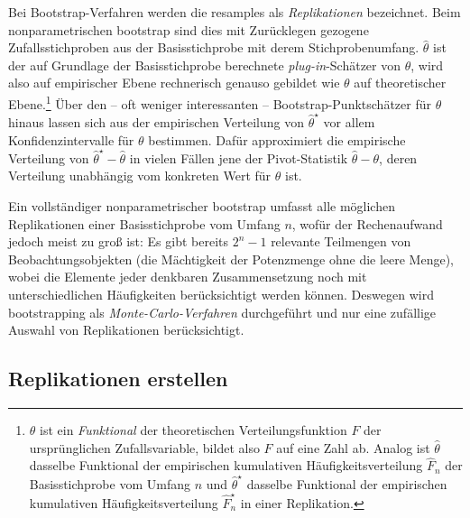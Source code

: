 Bei Bootstrap-Verfahren \cite{Chihara2011,Davison1997} werden die resamples als \emph{Replikationen} bezeichnet. Beim nonparametrischen bootstrap sind dies mit Zurücklegen gezogene Zufallsstichproben aus der Basisstichprobe mit derem Stichprobenumfang. $\hat{\theta}$ ist der auf Grundlage der Basisstichprobe berechnete \emph{plug-in}-Schätzer von $\theta$, wird also auf empirischer Ebene rechnerisch genauso gebildet wie $\theta$ auf theoretischer Ebene.\footnote{$\theta$ ist ein \emph{Funktional} der theoretischen Verteilungsfunktion $F$ der ursprünglichen Zufallsvariable, bildet also $F$ auf eine Zahl ab. Analog ist $\hat{\theta}$ dasselbe Funktional der empirischen kumulativen Häufigkeitsverteilung $\hat{F}_{n}$ der Basisstichprobe vom Umfang $n$ und $\hat{\theta}^{\star}$ dasselbe Funktional der empirischen kumulativen Häufigkeitsverteilung $\hat{F}_{n}^{\star}$ in einer Replikation.} Über den -- oft weniger interessanten -- Bootstrap-Punktschätzer für $\theta$ hinaus lassen sich aus der empirischen Verteilung von $\hat{\theta}^{\star}$ vor allem Konfidenzintervalle für $\theta$ bestimmen. Dafür approximiert die empirische Verteilung von $\hat{\theta}^{\star} - \hat{\theta}$ in vielen Fällen jene der Pivot-Statistik $\hat{\theta} - \theta$, deren Verteilung unabhängig vom konkreten Wert für $\theta$ ist.

Ein vollständiger nonparametrischer bootstrap umfasst alle möglichen Replikationen einer Basisstichprobe vom Umfang $n$, wofür der Rechenaufwand jedoch meist zu groß ist: Es gibt bereits $2^{n} - 1$ relevante Teilmengen von Beobachtungsobjekten (die Mächtigkeit der Potenzmenge ohne die leere Menge), wobei die Elemente jeder denkbaren Zusammensetzung noch mit unterschiedlichen Häufigkeiten berücksichtigt werden können. Deswegen wird bootstrapping als \emph{Monte-Carlo-Verfahren} durchgeführt und nur eine zufällige Auswahl von Replikationen berücksichtigt.

\subsection{Replikationen erstellen}
\label{sec:bootFun}

